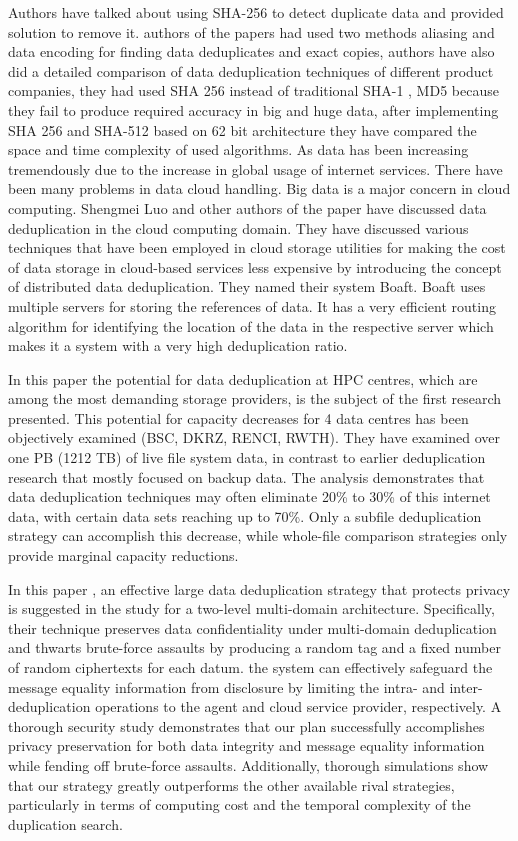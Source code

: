 \documentclass[%
 aip,
cp,  %
 amsmath,amssymb,%
 reprint,%
]{revtex4-2}
\begin{document}
Authors \cite{ls} have talked about using SHA-256 to detect duplicate data and provided solution to remove it. authors of the papers had used two methods aliasing and data encoding  for finding data deduplicates and exact copies, authors have also did a detailed comparison of data deduplication techniques of different product companies, they had used SHA 256 instead of traditional SHA-1 , MD5 because they fail to produce required accuracy in big and huge data, after implementing SHA 256 and SHA-512 based on 62 bit architecture they have compared the space and time complexity of used algorithms. As data has been increasing tremendously due to the increase in global usage of internet services. There have been many problems in data cloud handling. Big data is a major concern in cloud computing. 
Shengmei Luo and other authors \cite{lzwkl15} of the paper have discussed data deduplication in the cloud computing domain. They have discussed various techniques that have been employed in cloud storage utilities for making the cost of data storage in cloud-based services less expensive by introducing the concept of distributed data deduplication. They named their system Boaft. Boaft uses multiple servers for storing the references of data. It has a very efficient routing algorithm for identifying the location of the data in the respective server which makes it a system with a very high deduplication ratio.

In this paper \cite{mkbckk12} the potential for data deduplication at HPC centres, which are among the most demanding storage providers, is the subject of the first research presented. This potential for capacity decreases for 4 data centres has been objectively examined (BSC, DKRZ, RENCI, RWTH). They have examined over one PB (1212 TB) of live file system data, in contrast to earlier deduplication research that mostly focused on backup data. The analysis demonstrates that data deduplication techniques may often eliminate 20\% to 30\% of this internet data, with certain data sets reaching up to 70\%. Only a subfile deduplication strategy can accomplish this decrease, while whole-file comparison strategies only provide marginal capacity reductions.

In this paper \cite{ylstg21}, an effective large data deduplication strategy that protects privacy is suggested in the study for a two-level multi-domain architecture. Specifically, their technique preserves data confidentiality under multi-domain deduplication and thwarts brute-force assaults by producing a random tag and a fixed number of random ciphertexts for each datum. the system can effectively safeguard the message equality information from disclosure by limiting the intra- and inter-deduplication operations to the agent and cloud service provider, respectively. A thorough security study demonstrates that our plan successfully accomplishes privacy preservation for both data integrity and message equality information while fending off brute-force assaults. Additionally, thorough simulations show that our strategy greatly outperforms the other available rival strategies, particularly in terms of computing cost and the temporal complexity of the duplication search.
\end{document}
